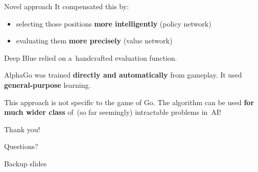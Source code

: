 \documentclass{beamer}
\begin{document}
{\begin{frame}{Novel approach}
      It compensated this by:
      \begin{itemize}[<+- | alert@+>]
        \item selecting those positions \textbf{more intelligently} (policy network)
        \item evaluating them \textbf{more precisely} (value network)
      \end{itemize}
      \pause

      Deep Blue relied on a~handcrafted evaluation function.
      \pause

      AlphaGo was trained \textbf{directly and automatically} from gameplay.
      It used \textbf{general-purpose} learning.
      \pause

      This approach is not specific to the game of Go.
      The algorithm can be used \textbf{for much wider class} of~(so far seemingly) intractable problems in~AI!
    \end{frame}
  }
  
  \begin{frame}[standout]
    \begin{center}
      Thank you!

      Questions?
    \end{center}
  \end{frame}


  \appendix

  \begin{frame}[standout]
    Backup slides
  \end{frame}
\end{document}
